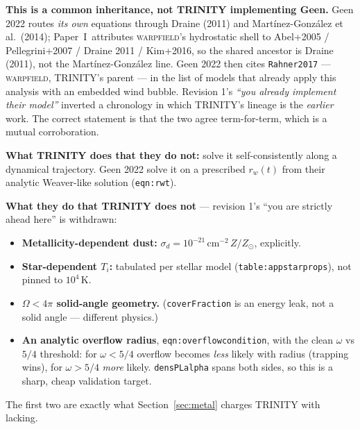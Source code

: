 \documentclass[11pt,a4paper,oneside]{report}
\newcommand{\brkus}{\textunderscore\allowbreak}
\newcommand{\code}[1]{\texttt{\small\let\_\brkus #1}}
\newcommand{\lbl}[1]{\texttt{\footnotesize\let\_\brkus #1}}
\newcommand{\PI}{Paper~I}
\begin{document}
\begin{keybox}
\textbf{\sffamily This is a common inheritance, not TRINITY implementing Geen.}
Geen 2022 routes \emph{its own} equations through Draine (2011) and
Mart\'inez-Gonz\'alez et al.\ (2014); \PI\ attributes \textsc{warpfield}'s hydrostatic shell to
Abel+2005 / Pellegrini+2007 / Draine 2011 / Kim+2016, so the shared ancestor is Draine (2011), not
the Mart\'inez-Gonz\'alez line. Geen 2022 then cites \code{Rahner2017} --- \textsc{warpfield},
TRINITY's parent --- in the list of models that already apply this analysis with an embedded wind
bubble. Revision 1's \emph{``you already
implement their model''} inverted a chronology in which TRINITY's lineage is the
\emph{earlier} work. The correct statement is that the two agree term-for-term, which is a
mutual corroboration.
\end{keybox}

\textbf{What TRINITY does that they do not:} solve it self-consistently along a dynamical
trajectory. Geen 2022 solve it on a prescribed $r_w(t)$ from their analytic Weaver-like
solution (\lbl{eqn:rwt}).

\textbf{What they do that TRINITY does not} --- revision 1's ``you are strictly ahead here''
is withdrawn:
\begin{itemize}
\item \textbf{Metallicity-dependent dust:} $\sigma_d = 10^{-21}\,\mathrm{cm}^{-2}\,Z/Z_\odot$,
      explicitly.
\item \textbf{Star-dependent $T_i$:} tabulated per stellar model
      (\lbl{table:app\_starprops}), not pinned to $10^4$\,K.
\item \textbf{$\Omega < 4\pi$ solid-angle geometry.} (\code{coverFraction} is an energy
      leak, not a solid angle --- different physics.)
\item \textbf{An analytic overflow radius}, \lbl{eqn:overflowcondition}, with the clean
      $\omega$ vs $5/4$ threshold: for $\omega<5/4$ overflow becomes \emph{less} likely with
      radius (trapping wins), for $\omega>5/4$ \emph{more} likely. \code{densPL\_alpha} spans
      both sides, so this is a sharp, cheap validation target.
\end{itemize}
The first two are exactly what Section~\ref{sec:metal} charges TRINITY with lacking.
\end{document}
